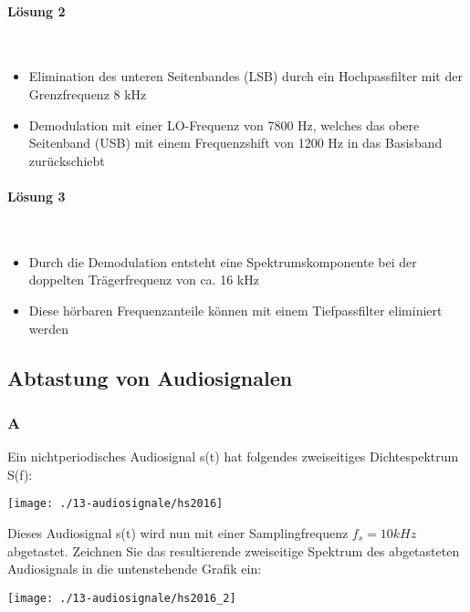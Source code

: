 \paragraph{Lösung 2}\mbox{}\\
\begin{itemize}
    \item Elimination des unteren Seitenbandes (LSB) durch ein Hochpassfilter mit der Grenzfrequenz 8 kHz
    \item Demodulation mit einer LO-Frequenz von 7800 Hz, welches das obere Seitenband (USB) mit einem Frequenzshift von 1200 Hz in das Basisband zurückschiebt
\end{itemize}

\paragraph{Lösung 3}\mbox{}\\
\begin{itemize}
    \item Durch die Demodulation entsteht eine Spektrumskomponente bei der doppelten Trägerfrequenz von ca. 16 kHz
    \item Diese hörbaren Frequenzanteile können mit einem Tiefpassfilter eliminiert werden
\end{itemize}

\subsection{Abtastung von Audiosignalen}
\subsubsection{A}
Ein nichtperiodisches Audiosignal s(t) hat folgendes zweiseitiges Dichtespektrum S(f):
\begin{center}
    \vspace{-8pt}
    \texttt{[image: ./13-audiosignale/hs2016]}
    \vspace{-8pt}
\end{center}

Dieses Audiosignal s(t) wird nun mit einer Samplingfrequenz $f_s = 10 kHz$ abgetastet. Zeichnen Sie das resultierende zweiseitige Spektrum des abgetasteten Audiosignals in die
untenstehende Grafik ein:
\begin{center}
    \vspace{-8pt}
    \texttt{[image: ./13-audiosignale/hs2016\_2]}
    \vspace{-8pt}
\end{center}

